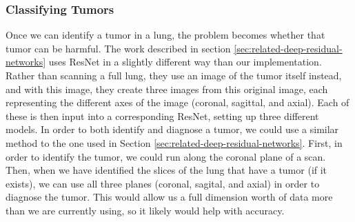 \documentclass[10pt,twocolumn,letterpaper]{article}
\begin{document}
      \subsubsection{Classifying Tumors} \label{sec:classify-tumor}

         Once we can identify a tumor in a lung, the problem becomes whether that tumor can be harmful. The work described in section \ref{sec:related-deep-residual-networks} uses ResNet in a slightly different way than our implementation. Rather than scanning a full lung, they use an image of the tumor itself instead, and with this image, they create three images from this original image, each representing the different axes of the image (coronal, sagittal, and axial). Each of these is then input into a corresponding ResNet, setting up three different models. In order to both identify and diagnose a tumor, we could use a similar method to the one used in Section \ref{sec:related-deep-residual-networks}. First, in order to identify the tumor, we could run along the coronal plane of a scan. Then, when we have identified the slices of the lung that have a tumor (if it exists), we can use all three planes (coronal, sagital, and axial) in order to diagnose the tumor. This would allow us a full dimension worth of data more than we are currently using, so it likely would help with accuracy.

{\small



}
\end{document}

